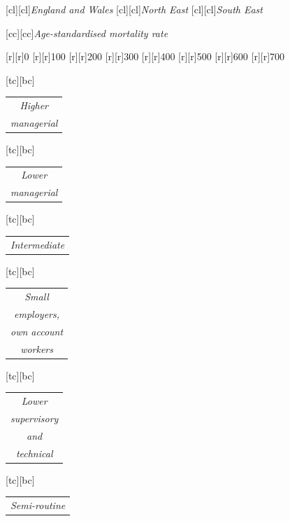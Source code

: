\documentclass[11 pt, a4paper]{report}
\renewcommand{\arraystretch}{1.2}
\begin{document}
\begin{figure}[hbtp!]
[cl][cl]{\small{\emph{England and Wales}}}
[cl][cl]{\small{\emph{North East}}}
[cl][cl]{\small{\emph{South East}}}

[cc][cc]{\small{\emph{Age-standardised mortality rate}}}

[r][r]{\small{0}}
[r][r]{\small{100}}
[r][r]{\small{200}}
[r][r]{\small{300}}
[r][r]{\small{400}}
[r][r]{\small{500}}
[r][r]{\small{600}}
[r][r]{\small{700}}

\renewcommand{\arraystretch}{0.7}

[tc][bc]{\scriptsize{
\begin{tabular}{c}
\emph{Higher}\\
\emph{managerial}\\
\end{tabular}
}}

[tc][bc]{\scriptsize{
\begin{tabular}{c}
\emph{Lower}\\
\emph{managerial}\\
\end{tabular}
}}

[tc][bc]{\scriptsize{
\begin{tabular}{c}
\emph{Intermediate}\\
\end{tabular}
}}

[tc][bc]{\scriptsize{
\begin{tabular}{c}
\emph{Small }\\
\emph{employers,}\\
\emph{own account}\\
\emph{workers}\\
\end{tabular}
}}

[tc][bc]{\scriptsize{
\begin{tabular}{c}
\emph{Lower}\\
\emph{supervisory}\\
\emph{and}\\
\emph{technical}\\
\end{tabular}
}}

[tc][bc]{\scriptsize{
\begin{tabular}{c}
\emph{Semi-routine}\\
\end{tabular}
}}


\end{figure}
\end{document}
